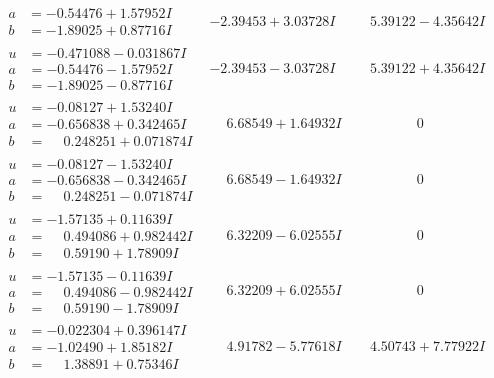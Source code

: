 \documentclass[1p]{elsarticle_modified}
\theoremstyle{definition}
\begin{document}
$$\begin{array}{c|c|c}
\begin{aligned}
a &= -0.54476 + 1.57952 I \\
b &= -1.89025 + 0.87716 I\end{aligned}
 & -2.39453 + 3.03728 I & \phantom{-}5.39122 - 4.35642 I \\ \hline\begin{aligned}
u &= -0.471088 - 0.031867 I \\
a &= -0.54476 - 1.57952 I \\
b &= -1.89025 - 0.87716 I\end{aligned}
 & -2.39453 - 3.03728 I & \phantom{-}5.39122 + 4.35642 I \\ \hline\begin{aligned}
u &= -0.08127 + 1.53240 I \\
a &= -0.656838 + 0.342465 I \\
b &= \phantom{-}0.248251 + 0.071874 I\end{aligned}
 & \phantom{-}6.68549 + 1.64932 I & \phantom{-0.000000 } 0 \\ \hline\begin{aligned}
u &= -0.08127 - 1.53240 I \\
a &= -0.656838 - 0.342465 I \\
b &= \phantom{-}0.248251 - 0.071874 I\end{aligned}
 & \phantom{-}6.68549 - 1.64932 I & \phantom{-0.000000 } 0 \\ \hline\begin{aligned}
u &= -1.57135 + 0.11639 I \\
a &= \phantom{-}0.494086 + 0.982442 I \\
b &= \phantom{-}0.59190 + 1.78909 I\end{aligned}
 & \phantom{-}6.32209 - 6.02555 I & \phantom{-0.000000 } 0 \\ \hline\begin{aligned}
u &= -1.57135 - 0.11639 I \\
a &= \phantom{-}0.494086 - 0.982442 I \\
b &= \phantom{-}0.59190 - 1.78909 I\end{aligned}
 & \phantom{-}6.32209 + 6.02555 I & \phantom{-0.000000 } 0 \\ \hline\begin{aligned}
u &= -0.022304 + 0.396147 I \\
a &= -1.02490 + 1.85182 I \\
b &= \phantom{-}1.38891 + 0.75346 I\end{aligned}
 & \phantom{-}4.91782 - 5.77618 I & \phantom{-}4.50743 + 7.77922 I \\ \hline\begin{aligned}

\end{aligned}
\end{array}$$
\end{document}
